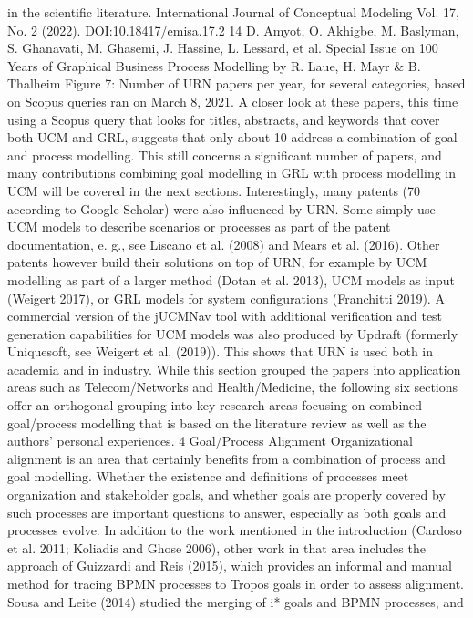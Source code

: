 in the scientific literature.
International Journal of Conceptual Modeling
Vol. 17, No. 2 (2022). DOI:10.18417/emisa.17.2
14 D. Amyot, O. Akhigbe, M. Baslyman, S. Ghanavati, M. Ghasemi, J. Hassine, L. Lessard, et al.
Special Issue on 100 Years of Graphical Business Process Modelling by R. Laue, H. Mayr & B. Thalheim
Figure 7: Number of URN papers per year, for several categories, based on Scopus queries ran on March 8, 2021.
A closer look at these papers, this time using a
Scopus query that looks for titles, abstracts, and
keywords that cover both UCM and GRL, suggests
that only about 10%
address a combination of goal and process modelling. This still concerns a significant number of
papers, and many contributions combining goal
modelling in GRL with process modelling in UCM
will be covered in the next sections.
Interestingly, many patents (70 according to
Google Scholar) were also influenced by URN.
Some simply use UCM models to describe scenarios or processes as part of the patent documentation, e. g., see Liscano et al. (2008) and Mears
et al. (2016). Other patents however build their
solutions on top of URN, for example by UCM
modelling as part of a larger method (Dotan et al.
2013), UCM models as input (Weigert 2017), or
GRL models for system configurations (Franchitti
2019). A commercial version of the jUCMNav
tool with additional verification and test generation
capabilities for UCM models was also produced
by Updraft (formerly Uniquesoft, see Weigert et al.
(2019)). This shows that URN is used both in
academia and in industry.
While this section grouped the papers into application areas such as Telecom/Networks and
Health/Medicine, the following six sections offer
an orthogonal grouping into key research areas
focusing on combined goal/process modelling that
is based on the literature review as well as the
authors’ personal experiences.
4 Goal/Process Alignment
Organizational alignment is an area that certainly
benefits from a combination of process and goal
modelling. Whether the existence and definitions
of processes meet organization and stakeholder
goals, and whether goals are properly covered by
such processes are important questions to answer,
especially as both goals and processes evolve.
In addition to the work mentioned in the introduction (Cardoso et al. 2011; Koliadis and
Ghose 2006), other work in that area includes the
approach of Guizzardi and Reis (2015), which
provides an informal and manual method for tracing BPMN processes to Tropos goals in order to
assess alignment. Sousa and Leite (2014) studied
the merging of i* goals and BPMN processes, and
